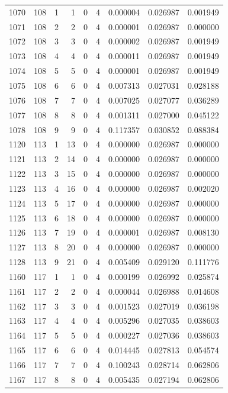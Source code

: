 \begin{longtable}{rrrrrrrrr}
1070 & 108 & 1 & 1 & 0 & 4 & 0.000004 & 0.026987 & 0.001949 \\
1071 & 108 & 2 & 2 & 0 & 4 & 0.000001 & 0.026987 & 0.000000 \\
1072 & 108 & 3 & 3 & 0 & 4 & 0.000002 & 0.026987 & 0.001949 \\
1073 & 108 & 4 & 4 & 0 & 4 & 0.000011 & 0.026987 & 0.001949 \\
1074 & 108 & 5 & 5 & 0 & 4 & 0.000001 & 0.026987 & 0.001949 \\
1075 & 108 & 6 & 6 & 0 & 4 & 0.007313 & 0.027031 & 0.028188 \\
1076 & 108 & 7 & 7 & 0 & 4 & 0.007025 & 0.027077 & 0.036289 \\
1077 & 108 & 8 & 8 & 0 & 4 & 0.001311 & 0.027000 & 0.045122 \\
1078 & 108 & 9 & 9 & 0 & 4 & 0.117357 & 0.030852 & 0.088384 \\
1120 & 113 & 1 & 13 & 0 & 4 & 0.000000 & 0.026987 & 0.000000 \\
1121 & 113 & 2 & 14 & 0 & 4 & 0.000000 & 0.026987 & 0.000000 \\
1122 & 113 & 3 & 15 & 0 & 4 & 0.000000 & 0.026987 & 0.000000 \\
1123 & 113 & 4 & 16 & 0 & 4 & 0.000000 & 0.026987 & 0.002020 \\
1124 & 113 & 5 & 17 & 0 & 4 & 0.000000 & 0.026987 & 0.000000 \\
1125 & 113 & 6 & 18 & 0 & 4 & 0.000000 & 0.026987 & 0.000000 \\
1126 & 113 & 7 & 19 & 0 & 4 & 0.000001 & 0.026987 & 0.008130 \\
1127 & 113 & 8 & 20 & 0 & 4 & 0.000000 & 0.026987 & 0.000000 \\
1128 & 113 & 9 & 21 & 0 & 4 & 0.005409 & 0.029120 & 0.111776 \\
1160 & 117 & 1 & 1 & 0 & 4 & 0.000199 & 0.026992 & 0.025874 \\
1161 & 117 & 2 & 2 & 0 & 4 & 0.000044 & 0.026988 & 0.014608 \\
1162 & 117 & 3 & 3 & 0 & 4 & 0.001523 & 0.027019 & 0.036198 \\
1163 & 117 & 4 & 4 & 0 & 4 & 0.005296 & 0.027035 & 0.038603 \\
1164 & 117 & 5 & 5 & 0 & 4 & 0.000227 & 0.027036 & 0.038603 \\
1165 & 117 & 6 & 6 & 0 & 4 & 0.014445 & 0.027813 & 0.054574 \\
1166 & 117 & 7 & 7 & 0 & 4 & 0.100243 & 0.028714 & 0.062806 \\
1167 & 117 & 8 & 8 & 0 & 4 & 0.005435 & 0.027194 & 0.062806 \\

\end{longtable}
